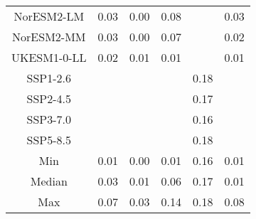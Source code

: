 \begin{table*}[t]
\begin{tabular}{c|rrr|rr}
NorESM2-LM & 0.03 & 0.00 & 0.08 &  & 0.03 \\
NorESM2-MM & 0.03 & 0.00 & 0.07 &  & 0.02 \\
UKESM1-0-LL & 0.02 & 0.01 & 0.01 &  & 0.01 \\
SSP1-2.6 &  &  &  & 0.18 &  \\
SSP2-4.5 &  &  &  & 0.17 &  \\
SSP3-7.0 &  &  &  & 0.16 &  \\
SSP5-8.5 &  &  &  & 0.18 &  \\
\midrule
Min & 0.01 & 0.00 & 0.01 & 0.16 & 0.01 \\
Median & 0.03 & 0.01 & 0.06 & 0.17 & 0.01 \\
Max & 0.07 & 0.03 & 0.14 & 0.18 & 0.08 \\
\bottomrule
\end{tabular}
\end{table*}
